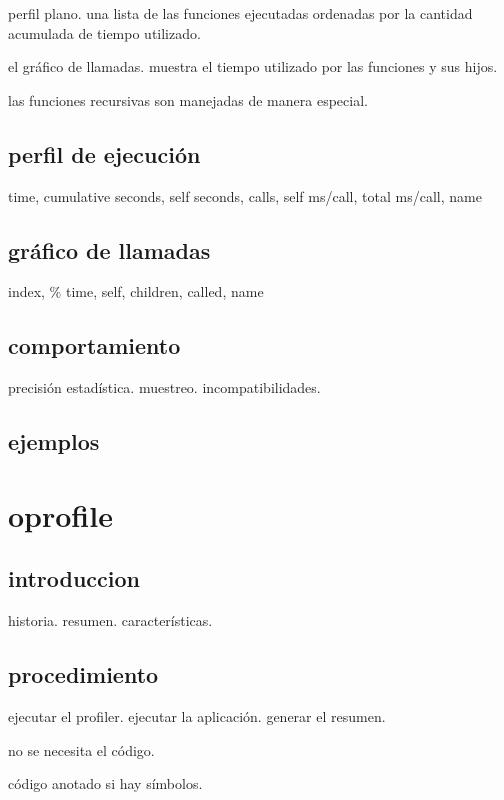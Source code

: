 \documentclass[a4paper]{report}
\begin{document}
perfil plano. una lista de las funciones ejecutadas ordenadas por la cantidad
acumulada de tiempo utilizado.

el gr\'afico de llamadas. muestra el tiempo utilizado por las funciones y sus hijos.

las funciones recursivas son manejadas de manera especial.

\subsection{perfil de ejecuci\'on}

time, cumulative seconds, self seconds, calls, self ms/call, total ms/call, name

\subsection{gr\'afico de llamadas}

index, \% time, self, children, called, name

\subsection{comportamiento}

precisi\'on estad\'istica. muestreo. incompatibilidades.

\subsection{ejemplos}

\section{oprofile}

\subsection{introduccion}

historia. resumen. caracter\'isticas. 

\subsection{procedimiento}

ejecutar el profiler. ejecutar la aplicaci\'on. generar el resumen.

no se necesita el c\'odigo.

c\'odigo anotado si hay s\'imbolos.
\end{document}
